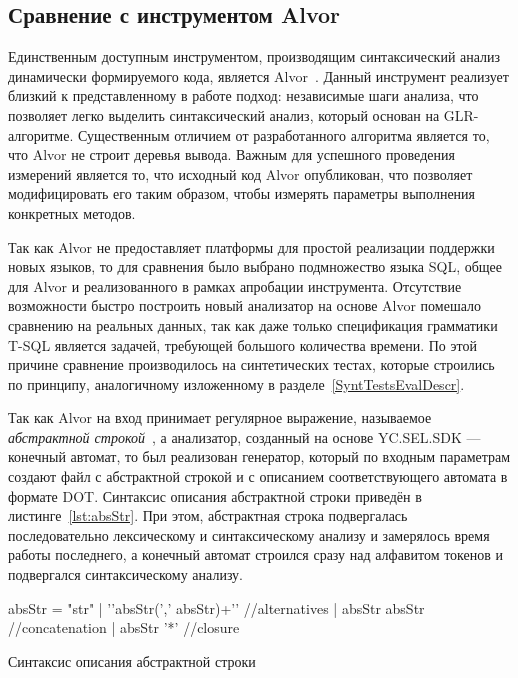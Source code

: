 \subsection{Сравнение с инструментом Alvor}

Единственным доступным инструментом, производящим синтаксический анализ динамически формируемого кода, является Alvor~\cite{Alvor1, Alvor2}. Данный инструмент реализует  близкий к представленному в работе подход: независимые шаги анализа, что позволяет легко выделить синтаксический анализ, который основан на GLR-алгоритме. Существенным отличием от разработанного алгоритма является то, что Alvor не строит деревья вывода. Важным для успешного проведения измерений является то, что исходный код Alvor опубликован, что позволяет модифицировать его таким образом, чтобы измерять параметры выполнения конкретных методов. 

Так как Alvor не предоставляет платформы для простой реализации поддержки новых языков, то для сравнения было выбрано подмножество языка SQL, общее для Alvor и реализованного в рамках апробации инструмента. Отсутствие возможности быстро построить новый анализатор на основе Alvor помешало сравнению на реальных данных, так как даже только спецификация грамматики T-SQL является задачей, требующей большого количества времени. По этой причине сравнение производилось на синтетических тестах, которые строились по принципу, аналогичному изложенному в разделе~\ref{SyntTestsEvalDescr}.  

Так как Alvor на вход принимает регулярное выражение, называемое \textit{абстрактной строкой}~\cite{Alvor2}, а анализатор, созданный на основе YC.SEL.SDK --- конечный автомат, то был реализован генератор, который по входным параметрам создают файл с абстрактной строкой и с описанием соответствующего автомата в формате DOT. Синтаксис описания абстрактной строки приведён в листинге~\ref{lst:absStr}. При этом, абстрактная строка подвергалась последовательно лексическому и синтаксическому анализу и замерялось время работы последнего, а конечный автомат строился сразу над алфавитом токенов и подвергался синтаксическому анализу.

\begin{listing}
    \begin{pyglist}[numbers=left,numbersep=5pt]
absStr = "str"
       | '{'absStr(',' absStr)+'}' //alternatives
       | absStr absStr             //concatenation
       | absStr '*'                //closure
\end{pyglist}
\caption{Синтаксис описания абстрактной строки}
\label{lst:absStr}
\end{listing}

